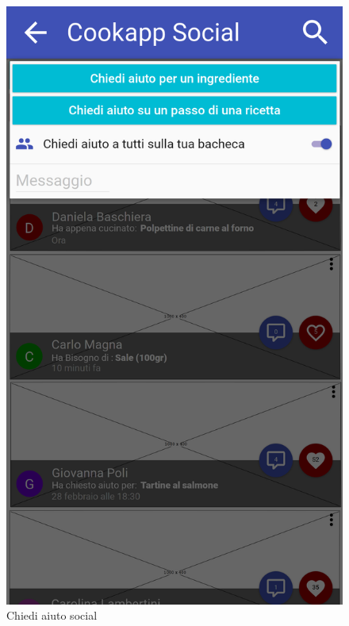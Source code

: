 \begin{figure}[H]
	\begin{minipage}{.49\textwidth}
		\includegraphics[width=\textwidth]{img/wireframe/chiedi_aiuto_social_a_tutti.png}
		\caption{Chiedi aiuto social}
		\label{fig:chiedi_aiuto_social}
	\end{minipage}
	\hfill
	\begin{minipage}{.49\textwidth}

\end{minipage}
\end{figure}
